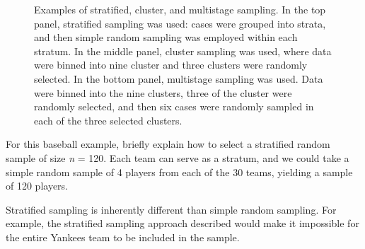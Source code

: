 \begin{figure}[p]
\centering
{}
\caption{Examples of stratified, cluster, and multistage sampling. In the top panel, stratified sampling was used: cases were grouped into strata, and then simple random sampling was employed within each stratum. In the middle panel, cluster sampling was used, where data were binned into nine cluster and three clusters were randomly selected. In the bottom panel, multistage sampling was used. Data were binned into the nine clusters, three of the cluster were randomly selected, and then six cases were randomly sampled in each of the three selected clusters.}
\label{stratified_cluster_multistage}
\end{figure}

\begin{examplewrap}
\begin{nexample}{For this baseball example, briefly explain how to select a stratified random sample of size \textit{n} = 120. }
Each team can serve as a stratum, and we could take a simple random sample of 4 players from each of the 30 teams, yielding a sample of 120 players.
\end{nexample}
\end{examplewrap}

Stratified sampling is inherently different than simple random sampling. For example, the stratified sampling approach described would make it impossible for the entire Yankees team to be included in the sample.

